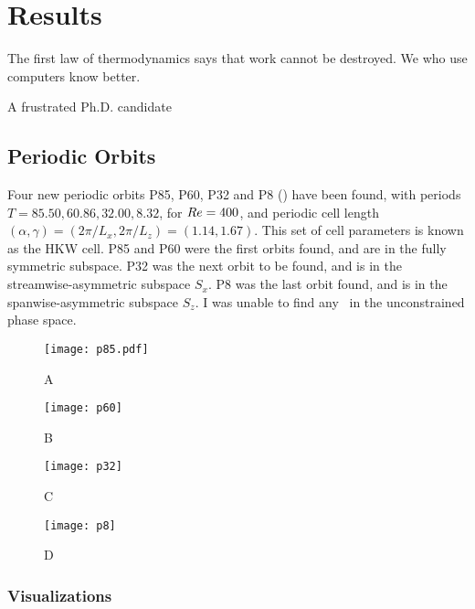 \chapter{Results}
\epigraph{The first law of thermodynamics says that work cannot be destroyed. We who use computers know better.}{A frustrated Ph.D. candidate}

\section{Periodic Orbits}

Four new periodic orbits P85, P60, P32 and P8 () have been found, with periods $T= 85.50, 60.86, 32.00, 8.32$, for $Re = 400$, and periodic cell length $(\alpha,\gamma) = (2\pi/L_x,2\pi/L_z) = (1.14,1.67)$. This  set of cell parameters is known as the HKW cell. P85 and P60 were the first orbits found, and are in the fully symmetric subspace. P32 was the next orbit to be found, and is in the streamwise-asymmetric subspace $S_x$. P8 was the last orbit found, and is in the spanwise-asymmetric subspace $S_z$. I was unable to find any \ecs\ in the unconstrained phase space. 

\begin{figure}
\centerline{\texttt{[image: p85.pdf]}}
\caption{A}\label{fig:p85}
\end{figure}

\begin{figure}
\centerline{\texttt{[image: p60]}}
\caption{B}\label{fig:p60}
\end{figure}


\begin{figure}
\centerline{\texttt{[image: p32]}}
\caption{C}\label{fig:p32}
\end{figure}


\begin{figure}
\centerline{\texttt{[image: p8]}}
\caption{D}\label{fig:p8}
\end{figure}

\subsection{Visualizations}   